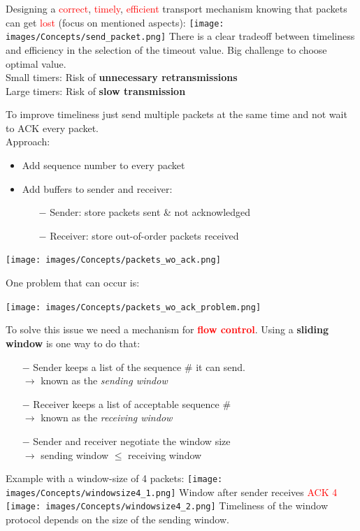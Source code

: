 \documentclass[a4paper, fontsize=8pt, landscape, DIV=1]{scrartcl}
\begin{document}
\begin{multicols*}{4}
		Designing a \textcolor{Red}{correct}, \textcolor{Red}{timely},
		\textcolor{Red}{efficient} transport mechanism knowing that packets can get
		\textcolor{Red}{lost} (focus on mentioned aspects):
		\texttt{[image: images/Concepts/send\_packet.png]} 	 
		There is a clear tradeoff between timeliness and efficiency in the
		selection of the timeout value. Big challenge to choose optimal value.\\
		Small timers: Risk of \textbf{unnecessary retransmissions}\\
		Large timers: Risk of \textbf{slow transmission} \par
		
		To improve timeliness just send multiple packets at the same time and not
		wait to ACK every packet. \\
		Approach: 
		\begin{itemize}[noitemsep]
			\item Add sequence number to every packet
			\item Add buffers to sender and receiver: 
			\begin{itemize}
				\item[$-$] Sender: store packets sent \& not acknowledged
				\item[$-$] Receiver: store out-of-order packets received
			\end{itemize}
		\end{itemize} 
		\texttt{[image: images/Concepts/packets\_wo\_ack.png]} 	
		
		One problem that can occur is: 
		
		\texttt{[image: images/Concepts/packets\_wo\_ack\_problem.png]}
		
		To solve this issue  we need a mechanism for \textcolor{Red}{\textbf{flow
				control}}.
		Using a \textbf{sliding window} is one way to do that:
		\begin{itemize}
			\item[$-$] Sender keeps a list of the sequence \# it can send.\\
			$\rightarrow$ known as the \textit{sending window}
			\columnbreak
			\item[$-$] Receiver keeps a list of acceptable sequence \#\\
			$\rightarrow$ known as the \textit{receiving window }
			\item[$-$] Sender and receiver negotiate the window size\\
			$\rightarrow$ sending window $\le$ receiving window
		\end{itemize} 
		Example with a window-size of 4 packets:
		\texttt{[image: images/Concepts/windowsize4\_1.png]} 
		Window after sender receives \textcolor{Red}{ACK 4 }
		\texttt{[image: images/Concepts/windowsize4\_2.png]} 
		Timeliness of the window protocol depends on the size of the sending
		window.\par
		

\end{multicols*}
\end{document}
